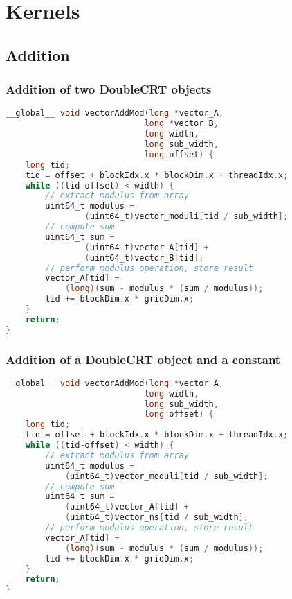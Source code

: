 \chapter{Kernels} \label{chap:Kernels}
\section{Addition} \label{sec:KernelAddition}
\subsection{Addition of two DoubleCRT objects}
\begin{lstlisting}[language=C,caption={Addition Kernel for Two DoubleCRT}]
__global__ void vectorAddMod(long *vector_A, 
                            long *vector_B, 
                            long width, 
                            long sub_width, 
                            long offset) {
	long tid;
	tid = offset + blockIdx.x * blockDim.x + threadIdx.x;
	while ((tid-offset) < width) {
	    // extract modulus from array
		uint64_t modulus = 
		        (uint64_t)vector_moduli[tid / sub_width];
		// compute sum
		uint64_t sum = 
		        (uint64_t)vector_A[tid] + 
		        (uint64_t)vector_B[tid];
		// perform modulus operation, store result
		vector_A[tid] = 
		    (long)(sum - modulus * (sum / modulus));
		tid += blockDim.x * gridDim.x;
	}
	return;
}
\end{lstlisting}

\subsection{Addition of a DoubleCRT object and a constant}
\begin{lstlisting}[language=C,caption={Addition Kernel for a DoubleCRT and a constant}]
__global__ void vectorAddMod(long *vector_A, 
                            long width, 
                            long sub_width, 
                            long offset) {
	long tid;
	tid = offset + blockIdx.x * blockDim.x + threadIdx.x;
	while ((tid-offset) < width) {
	    // extract modulus from array
		uint64_t modulus = 
		    (uint64_t)vector_moduli[tid / sub_width];
		// compute sum
		uint64_t sum = 
		    (uint64_t)vector_A[tid] + 
		    (uint64_t)vector_ns[tid / sub_width];
		// perform modulus operation, store result
		vector_A[tid] = 
		    (long)(sum - modulus * (sum / modulus));
		tid += blockDim.x * gridDim.x;
	}
	return;
}
\end{lstlisting}

